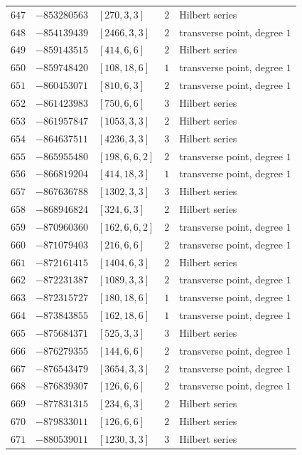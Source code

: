 \documentclass[11pt]{article}
\begin{document}
\begin{center}
\begin{longtable}{r r l c l}
$647$ & $-853280563$ & $[270,3,3]$ & $2$ & Hilbert series\\
$648$ & $-854139439$ & $[2466,3,3]$ & $2$ & transverse point, degree $1$\\
$649$ & $-859143515$ & $[414,6,6]$ & $2$ & Hilbert series\\
$650$ & $-859748420$ & $[108,18,6]$ & $1$ & transverse point, degree $1$\\
$651$ & $-860453071$ & $[810,6,3]$ & $2$ & transverse point, degree $1$\\
$652$ & $-861423983$ & $[750,6,6]$ & $3$ & Hilbert series\\
$653$ & $-861957847$ & $[1053,3,3]$ & $2$ & Hilbert series\\
$654$ & $-864637511$ & $[4236,3,3]$ & $3$ & Hilbert series\\
$655$ & $-865955480$ & $[198,6,6,2]$ & $2$ & transverse point, degree $1$\\
$656$ & $-866819204$ & $[414,18,3]$ & $1$ & transverse point, degree $1$\\
$657$ & $-867636788$ & $[1302,3,3]$ & $3$ & Hilbert series\\
$658$ & $-868946824$ & $[324,6,3]$ & $2$ & Hilbert series\\
$659$ & $-870960360$ & $[162,6,6,2]$ & $2$ & transverse point, degree $1$\\
$660$ & $-871079403$ & $[216,6,6]$ & $2$ & transverse point, degree $1$\\
$661$ & $-872161415$ & $[1404,6,3]$ & $2$ & Hilbert series\\
$662$ & $-872231387$ & $[1089,3,3]$ & $2$ & transverse point, degree $1$\\
$663$ & $-872315727$ & $[180,18,6]$ & $1$ & transverse point, degree $1$\\
$664$ & $-873843855$ & $[162,18,6]$ & $1$ & transverse point, degree $1$\\
$665$ & $-875684371$ & $[525,3,3]$ & $3$ & Hilbert series\\
$666$ & $-876279355$ & $[144,6,6]$ & $2$ & transverse point, degree $1$\\
$667$ & $-876543479$ & $[3654,3,3]$ & $2$ & transverse point, degree $1$\\
$668$ & $-876839307$ & $[126,6,6]$ & $2$ & transverse point, degree $1$\\
$669$ & $-877831315$ & $[234,6,3]$ & $2$ & Hilbert series\\
$670$ & $-879833011$ & $[126,6,6]$ & $2$ & Hilbert series\\
$671$ & $-880539011$ & $[1230,3,3]$ & $3$ & Hilbert series\\

\end{longtable}
\end{center}
\end{document}
